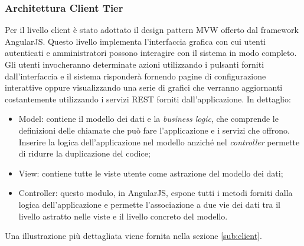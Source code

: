		\subsubsection{Architettura Client Tier}
		Per il livello client è stato adottato il design pattern MVW offerto dal framework AngularJS. Questo livello implementa l'interfaccia grafica con cui utenti autenticati e amministratori possono interagire con il sistema in modo completo.
		\newline
		Gli utenti invocheranno determinate azioni utilizzando i pulsanti forniti dall'interfaccia e il sistema risponderà fornendo pagine di configurazione interattive oppure visualizzando una serie di grafici che verranno aggiornanti costantemente utilizzando i servizi REST forniti dall'applicazione. In dettaglio:
		\begin{itemize}
			\item Model: contiene il modello dei dati e la \textit{business logic}, che comprende le definizioni delle chiamate che può fare l'applicazione e i servizi che offrono. Inserire la logica dell'applicazione nel modello anziché nel \textit{controller} permette di ridurre la duplicazione del codice;
			\item View: contiene tutte le viste utente come astrazione del modello dei dati;
			\item Controller: questo modulo, in AngularJS, espone tutti i metodi forniti dalla logica dell'applicazione e permette l'associazione a due vie dei dati tra il livello astratto nelle viste e il livello concreto del modello.
		\end{itemize}
		\noindent
		Una illustrazione più dettagliata viene fornita nella sezione \ref{sub:client}.

